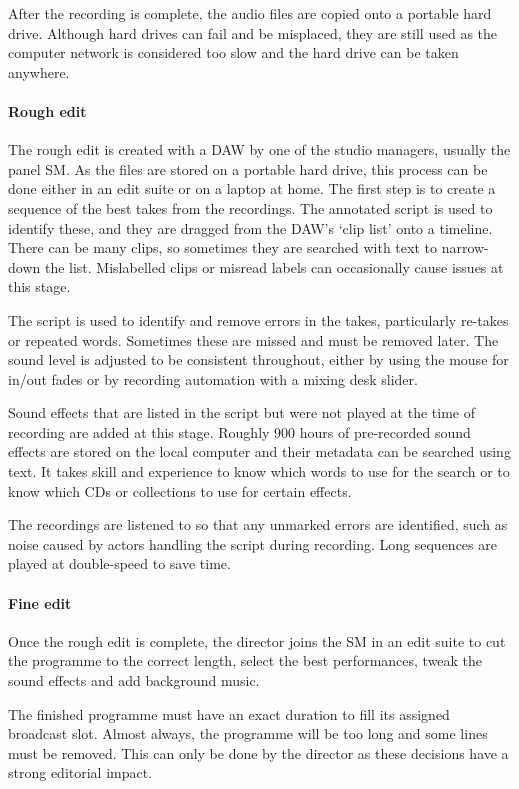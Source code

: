 After the recording is complete, the audio files are copied onto a portable hard drive. Although hard drives can fail
and be misplaced, they are still used as the computer network is considered too slow and the hard drive can be taken
anywhere.

\paragraph{Rough edit}
The rough edit is created with a DAW by one of the studio managers, usually the panel SM. As the files are stored on a
portable hard drive, this process can be done either in an edit suite or on a laptop at home. The first step is to
create a sequence of the best takes from the recordings. The annotated script is used to identify these, and they are
dragged from the DAW's `clip list' onto a timeline. There can be many clips, so sometimes they are searched with text
to narrow-down the list. Mislabelled clips or misread labels can occasionally cause issues at this stage.

The script is used to identify and remove errors in the takes, particularly re-takes or repeated words. Sometimes these
are missed and must be removed later. The sound level is adjusted to be consistent throughout, either by using the
mouse for in/out fades or by recording automation with a mixing desk slider.

Sound effects that are listed in the script but were not played at the time of recording are added at this stage.
Roughly 900 hours of pre-recorded sound effects are stored on the local computer and their metadata can be searched
using text. It takes skill and experience to know which words to use for the search or to know which CDs or collections
to use for certain effects.

The recordings are listened to so that any unmarked errors are identified, such as noise caused by actors handling the
script during recording. Long sequences are played at double-speed to save time.

\paragraph{Fine edit}\label{sec:drama-fine}
Once the rough edit is complete, the director joins the SM in an edit suite to cut the programme to the correct length,
select the best performances, tweak the sound effects and add background music.

The finished programme must have an exact duration to fill its assigned broadcast slot. Almost always, the programme
will be too long and some lines must be removed. This can only be done by the director as these decisions have a strong
editorial impact.

